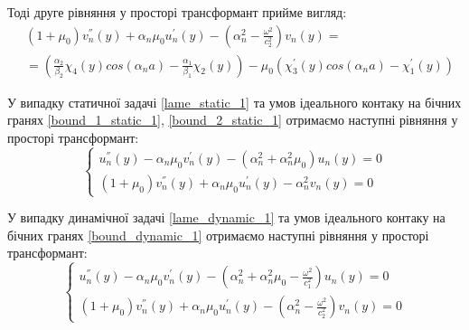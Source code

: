 Тоді друге рівняння у просторі трансформант прийме вигляд:
\begin{align*}
    &(1 + \mu_0) v_n^{''}(y) + \alpha_n \mu_0 u_n^{'}(y)  - (\alpha_n^2 -  \frac{\omega^2}{c_2^2}) v_n(y) = \\ 
    &= (\frac{\alpha_2}{\beta_2}\chi_4(y) cos(\alpha_n a) - \frac{\alpha_1}{\beta_1}\chi_2(y)) - \mu_0 (\chi_3^{'}(y) cos(\alpha_n a) -\chi_1^{'}(y))
\end{align*}

У випадку статичної задачі \eqref{lame_static_1} та умов ідеального контаку на бічних гранях \eqref{bound_1_static_1}, \eqref{bound_2_static_1}
отримаємо наступні рівняння у просторі трансформант:
\begin{equation*}
    \begin{cases}
        u_n^{''}(y) - \alpha_n \mu_0 v_n^{'}(y) -(\alpha_n^2 + \alpha_n^2 \mu_0) u_n(y) = 0 \\
        (1 + \mu_0) v_n^{''}(y) + \alpha_n \mu_0 u_n^{'}(y)  - \alpha_n^2 v_n(y) = 0
    \end{cases}
\end{equation*}

У випадку динамічної задачі \eqref{lame_dynamic_1} та умов ідеального контаку на бічних гранях \eqref{bound_dynamic_1}
отримаємо наступні рівняння у просторі трансформант:
\begin{equation*}
    \begin{cases}
        u_n^{''}(y) - \alpha_n \mu_0 v_n^{'}(y) -(\alpha_n^2 + \alpha_n^2 \mu_0 - \frac{\omega^2}{c_1^2}) u_n(y) = 0 \\
        (1 + \mu_0) v_n^{''}(y) + \alpha_n \mu_0 u_n^{'}(y)  - (\alpha_n^2 -  \frac{\omega^2}{c_2^2}) v_n(y) = 0
    \end{cases}
\end{equation*}

